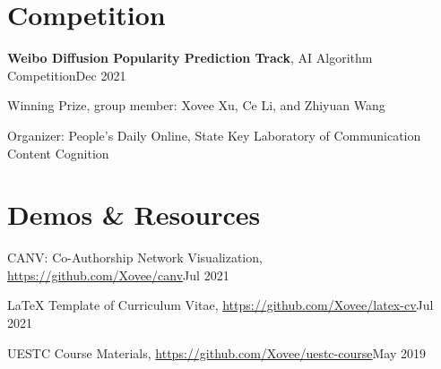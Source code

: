 \section*{Competition}
\indent

\textbf{Weibo Diffusion Popularity Prediction Track}, AI Algorithm Competition\hfill Dec 2021

\hspace{2em}Winning Prize, group member: Xovee Xu, Ce Li, and Zhiyuan Wang

\hspace{2em}Organizer: People's Daily Online, State Key Laboratory of Communication Content Cognition

\section*{Demos \& Resources}
\indent 

CANV: Co-Authorship Network Visualization, \url{https://github.com/Xovee/canv}\hfill Jul 2021

LaTeX Template of Curriculum Vitae, \url{https://github.com/Xovee/latex-cv}\hfill Jul 2021

UESTC Course Materials, \url{https://github.com/Xovee/uestc-course}\hfill May 2019 
